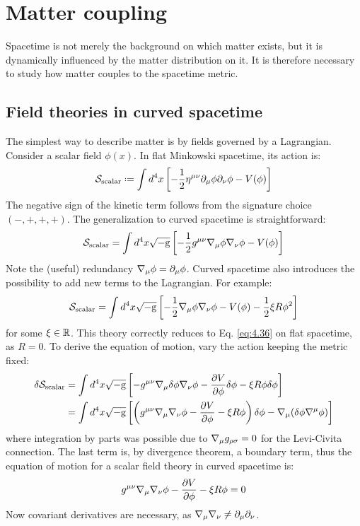 \section{Matter coupling}

Spacetime is not merely the background on which matter exists, but it is dynamically influenced by the matter distribution on it. It is therefore necessary to study how matter couples to the spacetime metric.

\subsection{Field theories in curved spacetime}

The simplest way to describe matter is by fields governed by a Lagrangian. Consider a scalar field $ \phi(x) $. In flat Minkowski spacetime, its action is:
\begin{equation}
  \mathcal{S}_{\text{scalar}} \defeq \int d^4 x \left[ - \frac{1}{2} \eta^{\mu \nu} \pa_\mu \phi \pa_\nu \phi - V(\phi) \right]
  \label{eq:4.36}
\end{equation}
The negative sign of the kinetic term follows from the signature choice $ (-,+,+,+) $. The generalization to curved spacetime is straightforward:
\begin{equation*}
  \mathcal{S}_{\text{scalar}} = \int d^4 x \sqrt{-\mathrm{g}} \left[ - \frac{1}{2} g^{\mu \nu} \nabla_\mu \phi \nabla_\nu \phi - V(\phi) \right]
\end{equation*}
Note the (useful) redundancy $ \nabla_\mu \phi = \partial_\mu \phi $. Curved spacetime also introduces the possibility to add new terms to the Lagrangian. For example:
\begin{equation}
  \mathcal{S}_{\text{scalar}} = \int d^4 x \sqrt{-\mathrm{g}} \left[ - \frac{1}{2} \nabla_\mu \phi \nabla_\nu \phi - V(\phi) - \frac{1}{2} \xi R \phi^2 \right]
  \label{eq:4.37}
\end{equation}
for some $ \xi \in \mathbb{R} $. This theory correctly reduces to Eq. \ref{eq:4.36} on flat spacetime, as $ R = 0 $. To derive the equation of motion, vary the action keeping the metric fixed:
\begin{equation*}
  \begin{split}
    \delta \mathcal{S}_{\text{scalar}}
    &= \int d^4 x \sqrt{-\mathrm{g}} \left[ - g^{\mu \nu} \nabla_\mu \delta \phi \nabla_\nu \phi - \frac{\partial V}{\partial \phi} \delta \phi - \xi R \phi \delta \phi \right] \\
    &= \int d^4 x \sqrt{-\mathrm{g}} \left[ \left( g^{\mu \nu} \nabla_\mu \nabla_\nu \phi - \frac{\partial V}{\partial \phi} - \xi R \phi \right) \delta \phi - \nabla_\mu ( \delta \phi \nabla^\mu \phi ) \right]
  \end{split}
\end{equation*}
where integration by parts was possible due to $ \nabla_\mu g_{\rho \sigma} = 0 $ for the Levi-Civita connection. The last term is, by divergence theorem, a boundary term, thus the equation of motion for a scalar field theory in curved spacetime is:
\begin{equation}
  g^{\mu \nu} \nabla_\mu \nabla_\nu \phi - \frac{\partial V}{\partial \phi} - \xi R \phi = 0
  \label{eq:4.38}
\end{equation}
Now covariant derivatives are necessary, as $ \nabla_\mu \nabla_\nu \neq \partial_\mu \partial_\nu $.

